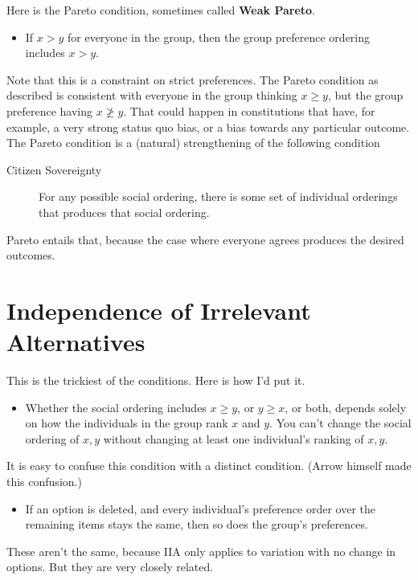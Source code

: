 Here is the Pareto condition, sometimes called \textbf{Weak Pareto}.

\begin{itemize}
\item{} If $x > y$ for everyone in the group, then the group preference ordering includes $x > y$.

\end{itemize}
Note that this is a constraint on strict preferences. The Pareto condition as described is consistent with everyone in the group thinking $x \geq y$, but the group preference having $x \ngeq y$. That could happen in constitutions that have, for example, a very strong status quo bias, or a bias towards any particular outcome. The Pareto condition is a (natural) strengthening of the following condition

\begin{description}
\item[Citizen Sovereignty]

For any possible social ordering, there is some set of individual orderings that produces that social ordering.
\end{description}
Pareto entails that, because the case where everyone agrees produces the desired outcomes.

\section{Independence of Irrelevant Alternatives}
\label{independenceofirrelevantalternatives}

This is the trickiest of the conditions. Here is how I'd put it.

\begin{itemize}
\item{} Whether the social ordering includes $x \geq y$, or $y \geq x$, or both, depends solely on how the individuals in the group rank $x$ and $y$. You can't change the social ordering of $x, y$ without changing at least one individual's ranking of $x, y$.

\end{itemize}
It is easy to confuse this condition with a distinct condition. (Arrow himself made this confusion.)

\begin{itemize}
\item{} If an option is deleted, and every individual's preference order over the remaining items stays the same, then so does the group's preferences.

\end{itemize}
These aren't the same, because IIA only applies to variation with no change in options. But they are very closely related.

